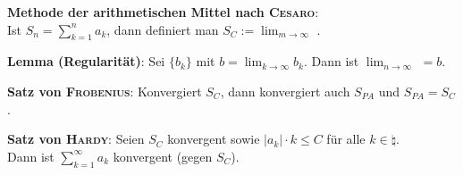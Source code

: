 \textbf{Methode der arithmetischen Mittel nach \textsc{Cesaro}}: \\
Ist $S_n = \sum_{k=1}^n a_k$, dann definiert man
$S_C := \lim_{m \to \infty}$ .

\textbf{Lemma (Regularität)}: Sei $\{b_k\}$ mit
$b = \lim_{k \to \infty} b_k$. \qquad
Dann ist $\lim_{n \to \infty}$  $= b$.

\textbf{Satz von \textsc{Frobenius}}:
Konvergiert $S_C$, dann konvergiert auch $S_{PA}$ und $S_{PA} = S_C$.

\textbf{Satz von \textsc{Hardy}}:
Seien $S_C$ konvergent sowie $|a_k| \cdot k \le C$ für alle
$k \in \natural$. \\
Dann ist $\sum_{k=1}^\infty a_k$ konvergent (gegen $S_C$).

\pagebreak
